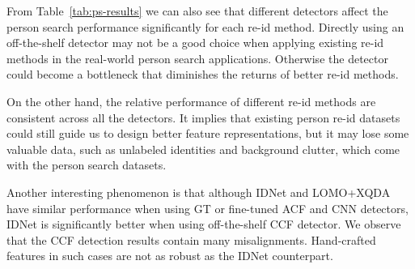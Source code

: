 From Table~\ref{tab:ps-results} we can also see that different detectors affect the person search performance significantly for each re-id method. Directly using an off-the-shelf detector may not be a good choice when applying existing re-id methods in the real-world person search applications. Otherwise the detector could become a bottleneck that diminishes the returns of better re-id methods.

On the other hand, the relative performance of different re-id methods are consistent across all the detectors. It implies that existing person re-id datasets could still guide us to design better feature representations, but it may lose some valuable data, such as unlabeled identities and background clutter, which come with the person search datasets.

Another interesting phenomenon is that although IDNet and LOMO+XQDA have similar performance when using GT or fine-tuned ACF and CNN detectors, IDNet is significantly better when using off-the-shelf CCF detector. We observe that the CCF detection results contain many misalignments. Hand-crafted features in such cases are not as robust as the IDNet counterpart.

